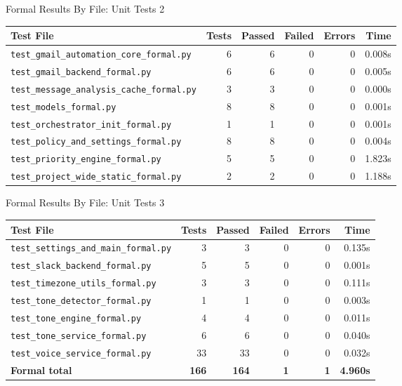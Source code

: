 \begin{frame}{Formal Results By File: Unit Tests 2}
\scriptsize
\begin{tabular}{p{}rrrrr}
\hline
\textbf{Test File} & \textbf{Tests} & \textbf{Passed} & \textbf{Failed} & \textbf{Errors} & \textbf{Time}\\
\hline
\texttt{test\_gmail\_automation\_core\_formal.py} & 6 & 6 & 0 & 0 & 0.008s\\
\texttt{test\_gmail\_backend\_formal.py} & 6 & 6 & 0 & 0 & 0.005s\\
\texttt{test\_message\_analysis\_cache\_formal.py} & 3 & 3 & 0 & 0 & 0.000s\\
\texttt{test\_models\_formal.py} & 8 & 8 & 0 & 0 & 0.001s\\
\texttt{test\_orchestrator\_init\_formal.py} & 1 & 1 & 0 & 0 & 0.001s\\
\texttt{test\_policy\_and\_settings\_formal.py} & 8 & 8 & 0 & 0 & 0.004s\\
\texttt{test\_priority\_engine\_formal.py} & 5 & 5 & 0 & 0 & 1.823s\\
\texttt{test\_project\_wide\_static\_formal.py} & 2 & 2 & 0 & 0 & 1.188s\\
\hline
\end{tabular}
\end{frame}

\begin{frame}{Formal Results By File: Unit Tests 3}
\scriptsize
\begin{tabular}{p{}rrrrr}
\hline
\textbf{Test File} & \textbf{Tests} & \textbf{Passed} & \textbf{Failed} & \textbf{Errors} & \textbf{Time}\\
\hline
\texttt{test\_settings\_and\_main\_formal.py} & 3 & 3 & 0 & 0 & 0.135s\\
\texttt{test\_slack\_backend\_formal.py} & 5 & 5 & 0 & 0 & 0.001s\\
\texttt{test\_timezone\_utils\_formal.py} & 3 & 3 & 0 & 0 & 0.111s\\
\texttt{test\_tone\_detector\_formal.py} & 1 & 1 & 0 & 0 & 0.003s\\
\texttt{test\_tone\_engine\_formal.py} & 4 & 4 & 0 & 0 & 0.011s\\
\texttt{test\_tone\_service\_formal.py} & 6 & 6 & 0 & 0 & 0.040s\\
\texttt{test\_voice\_service\_formal.py} & 33 & 33 & 0 & 0 & 0.032s\\
\hline
\textbf{Formal total} & \textbf{166} & \textbf{164} & \textbf{1} & \textbf{1} & \textbf{4.960s}\\
\hline
\end{tabular}
\end{frame}

